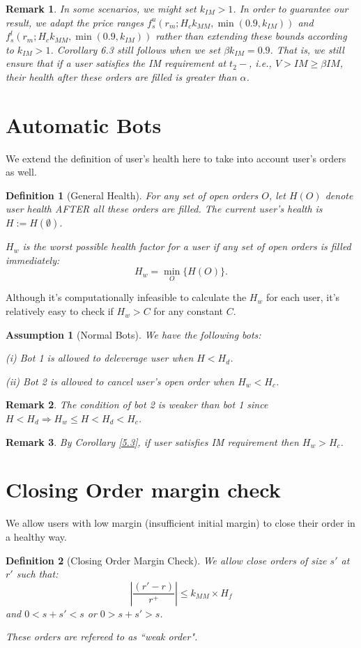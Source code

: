 \documentclass[notitlepage,reqno,11pt]{amsart}
\numberwithin{equation}{section}
\newtheorem{assumption}{Assumption}[section]
\newtheorem{definition}{Definition}[section]
\newtheorem{remark}{Remark}[section]
\newcommand{\RA}{\Rightarrow}
\begin{document}
\begin{remark}
    In some scenarios, we might set $k_{IM} > 1$. In order to guarantee our result, we adapt the price ranges $f^u_s(r_m; H_c k_{MM}, \min(0.9, k_{IM}))$ and $f^l_s(r_m; H_c k_{MM}, \min(0.9, k_{IM}))$ rather than extending these bounds according to $k_{IM} > 1$. Corollary 6.3 still follows when we set $\beta k_{IM} = 0.9$. That is, we still ensure that if a user satisfies the IM requirement at $t_2-$, i.e., $V > IM \geq \beta IM$, their health after these orders are filled is greater than $\alpha$.
\end{remark}

\section{Automatic Bots}
We extend the definition of user's health here to take into account user's orders as well.
\begin{definition}[General Health]\label{H-after}
    For any set of open orders $O$, let $H(O)$ denote user health AFTER all these orders are filled. The current user's health is $H := H(\emptyset)$.
    
    $H_w$ is the worst possible health factor for a user if any set of open orders is filled immediately:
    $$
    H_w = \min_{O} \{H(O)\}.
    $$
\end{definition}
Although it's computationally infeasible to calculate the $H_w$ for each user, it's relatively easy to check if $H_w>C$ for any constant $C$. 
\begin{assumption}[Normal Bots]\label{bots} We have the following bots:
    
    (i) Bot 1 is allowed to deleverage user when $H < H_d$.
    
    (ii) Bot 2 is allowed to cancel user's open order when $H_w < H_c$. 
    
\end{assumption}

\begin{remark}
    The condition of bot 2 is weaker than bot 1 since $H < H_d \RA H_w\leq H < H_d < H_c$.
\end{remark}
\begin{remark}
    By Corollary \ref{5.3}, if user satisfies IM requirement then $H_w > H_c$. 
\end{remark}

\section{Closing Order margin check}\label{weak-margin-check}
We allow users with low margin (insufficient initial margin) to close their order in a healthy way. 
\begin{definition}[Closing Order Margin Check]
    We allow close orders of size $s'$ at $r'$ such that:
    \begin{equation}\label{weak-margin}
    \left|\frac{(r'-r)}{ r^+}\right|\leq k_{MM}\times H_f 
    \end{equation}
    and $0< s + s' < s$ or $0 > s+s' > s$.

    These orders are refereed to as ``weak order".
\end{definition}
\end{document}
